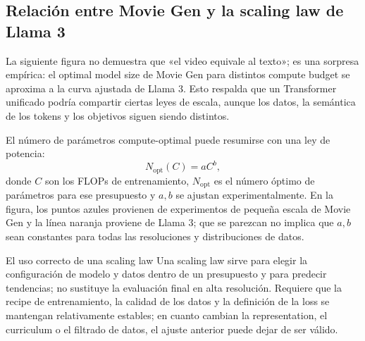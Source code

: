 
\subsection{Relación entre Movie Gen y la scaling law de Llama 3}

La siguiente figura no demuestra que «el video equivale al texto»; es una sorpresa empírica: el optimal model size de Movie Gen para distintos compute budget se aproxima a la curva ajustada de Llama 3. Esto respalda que un Transformer unificado podría compartir ciertas leyes de escala, aunque los datos, la semántica de los tokens y los objetivos siguen siendo distintos.


El número de parámetros compute-optimal puede resumirse con una ley de potencia:
\[
N_{\mathrm{opt}}(C)=aC^b,
\]
donde $C$ son los FLOPs de entrenamiento, $N_{\mathrm{opt}}$ es el número óptimo de parámetros para ese presupuesto y $a,b$ se ajustan experimentalmente. En la figura, los puntos azules provienen de experimentos de pequeña escala de Movie Gen y la línea naranja proviene de Llama 3; que se parezcan no implica que $a,b$ sean constantes para todas las resoluciones y distribuciones de datos.

\begin{importantbox}{El uso correcto de una scaling law}
Una scaling law sirve para elegir la configuración de modelo y datos dentro de un presupuesto y para predecir tendencias; no sustituye la evaluación final en alta resolución. Requiere que la recipe de entrenamiento, la calidad de los datos y la definición de la loss se mantengan relativamente estables; en cuanto cambian la representation, el curriculum o el filtrado de datos, el ajuste anterior puede dejar de ser válido.
\end{importantbox}


